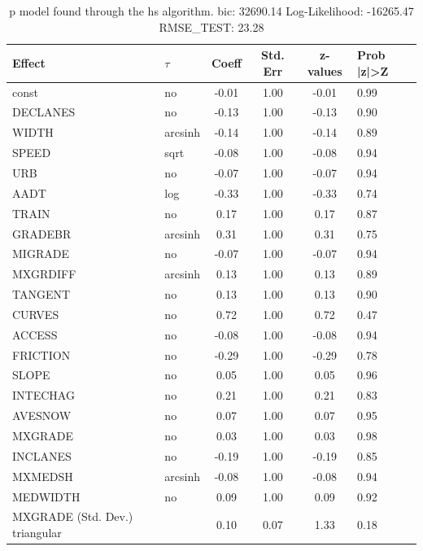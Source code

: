 \begin{table}
	\caption{p model found through the hs algorithm. bic: 32690.14 Log-Likelihood: -16265.47 RMSE_TEST: 23.28}
	\begin{center}
		\begin{tabular}{|l|l|c|c|c|l|}
			\hline
			Effect & $\tau$ & Coeff & Std. Err & z-values & Prob |z|>Z \\
			\hline
			const & no & -0.01 & 1.00 & -0.01 & 0.99 \\
			\hline
			DECLANES & no & -0.13 & 1.00 & -0.13 & 0.90 \\
			\hline
			WIDTH & arcsinh & -0.14 & 1.00 & -0.14 & 0.89 \\
			\hline
			SPEED & sqrt & -0.08 & 1.00 & -0.08 & 0.94 \\
			\hline
			URB & no & -0.07 & 1.00 & -0.07 & 0.94 \\
			\hline
			AADT & log & -0.33 & 1.00 & -0.33 & 0.74 \\
			\hline
			TRAIN & no & 0.17 & 1.00 & 0.17 & 0.87 \\
			\hline
			GRADEBR & arcsinh & 0.31 & 1.00 & 0.31 & 0.75 \\
			\hline
			MIGRADE & no & -0.07 & 1.00 & -0.07 & 0.94 \\
			\hline
			MXGRDIFF & arcsinh & 0.13 & 1.00 & 0.13 & 0.89 \\
			\hline
			TANGENT & no & 0.13 & 1.00 & 0.13 & 0.90 \\
			\hline
			CURVES & no & 0.72 & 1.00 & 0.72 & 0.47 \\
			\hline
			ACCESS & no & -0.08 & 1.00 & -0.08 & 0.94 \\
			\hline
			FRICTION & no & -0.29 & 1.00 & -0.29 & 0.78 \\
			\hline
			SLOPE & no & 0.05 & 1.00 & 0.05 & 0.96 \\
			\hline
			INTECHAG & no & 0.21 & 1.00 & 0.21 & 0.83 \\
			\hline
			AVESNOW & no & 0.07 & 1.00 & 0.07 & 0.95 \\
			\hline
			MXGRADE & no & 0.03 & 1.00 & 0.03 & 0.98 \\
			\hline
			INCLANES & no & -0.19 & 1.00 & -0.19 & 0.85 \\
			\hline
			MXMEDSH & arcsinh & -0.08 & 1.00 & -0.08 & 0.94 \\
			\hline
			MEDWIDTH & no & 0.09 & 1.00 & 0.09 & 0.92 \\
			\hline
			MXGRADE (Std. Dev.) triangular &  & 0.10 & 0.07 & 1.33 & 0.18 \\
			\hline

\end{tabular}
\end{center}
\end{table}
